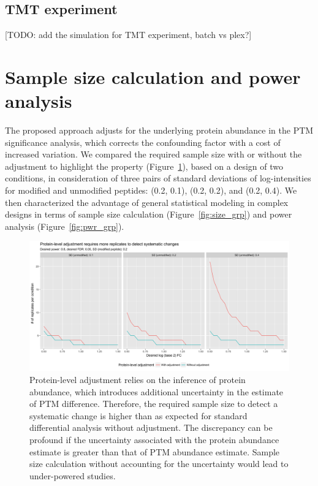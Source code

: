 \documentclass{mcp}
\def\todo#1{{\color{red}[TODO: #1]}}
\def\sfigref#1{{Figure~\ref{#1}}}
\begin{document}
\clearpage
\subsection{TMT experiment}
\label{sec:tmtsim}

\todo{add the simulation for TMT experiment, batch vs plex?}


\clearpage
\section{Sample size calculation and power analysis}

The proposed approach adjusts for the underlying protein abundance in the PTM significance analysis, which corrects the confounding factor with a cost of increased variation. We compared the required sample size with or without the adjustment to highlight the property (\sfigref{fig:size_prot}), based on a design of two conditions, in consideration of three pairs of standard deviations of log-intensities for modified and unmodified peptides: (0.2, 0.1), (0.2, 0.2), and (0.2, 0.4). 
We then characterized the advantage of general statistical modeling in complex designs in terms of sample size calculation (\sfigref{fig:size_grp}) and power analysis (\sfigref{fig:pwr_grp}). 

\begin{figure}[h!]
\centering
\includegraphics[width=\textwidth]{sim/size_prot}
\caption{Protein-level adjustment relies on the inference of protein abundance, which introduces additional uncertainty in the estimate of PTM difference. Therefore, the required sample size to detect a systematic change is higher than as expected for standard differential analysis without adjustment. The discrepancy can be profound if the uncertainty associated with the protein abundance estimate is greater than that of PTM abundance estimate. Sample size calculation without accounting for the uncertainty would lead to under-powered studies. \label{fig:size_prot}}
\end{figure}
\end{document}
